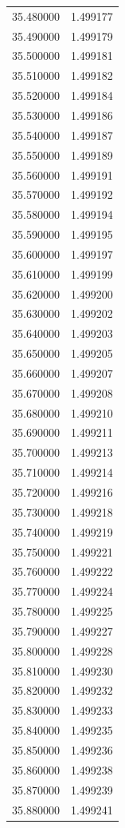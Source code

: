\begin{tabular}{rr}
35.480000 & 1.499177 \\
35.490000 & 1.499179 \\
35.500000 & 1.499181 \\
35.510000 & 1.499182 \\
35.520000 & 1.499184 \\
35.530000 & 1.499186 \\
35.540000 & 1.499187 \\
35.550000 & 1.499189 \\
35.560000 & 1.499191 \\
35.570000 & 1.499192 \\
35.580000 & 1.499194 \\
35.590000 & 1.499195 \\
35.600000 & 1.499197 \\
35.610000 & 1.499199 \\
35.620000 & 1.499200 \\
35.630000 & 1.499202 \\
35.640000 & 1.499203 \\
35.650000 & 1.499205 \\
35.660000 & 1.499207 \\
35.670000 & 1.499208 \\
35.680000 & 1.499210 \\
35.690000 & 1.499211 \\
35.700000 & 1.499213 \\
35.710000 & 1.499214 \\
35.720000 & 1.499216 \\
35.730000 & 1.499218 \\
35.740000 & 1.499219 \\
35.750000 & 1.499221 \\
35.760000 & 1.499222 \\
35.770000 & 1.499224 \\
35.780000 & 1.499225 \\
35.790000 & 1.499227 \\
35.800000 & 1.499228 \\
35.810000 & 1.499230 \\
35.820000 & 1.499232 \\
35.830000 & 1.499233 \\
35.840000 & 1.499235 \\
35.850000 & 1.499236 \\
35.860000 & 1.499238 \\
35.870000 & 1.499239 \\
35.880000 & 1.499241 \\

\end{tabular}
